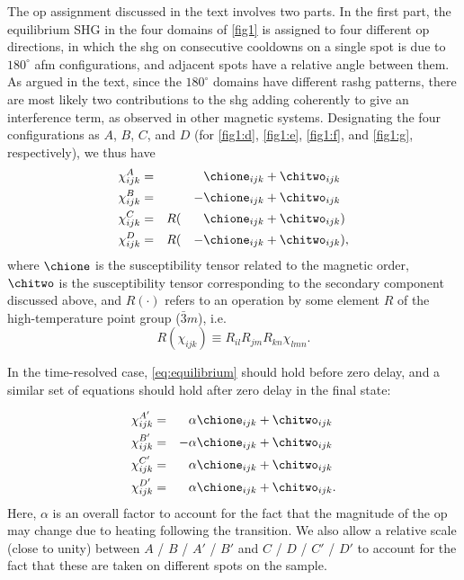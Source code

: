 The \gls{op} assignment discussed in the text involves two parts.
In the first part, the equilibrium SHG in the four domains of \cref{fig1} is assigned to four different \gls{op} directions, in which the \gls{shg} on consecutive cooldowns on a single spot is due to $180^\circ$ \gls{afm} configurations, and adjacent spots have a relative angle between them.
As argued in the text, since the $180^\circ$ domains have different \gls{rashg} patterns, there are most likely two contributions to the \gls{shg} adding coherently to give an interference term, as observed in other magnetic systems\citep{fiebig_second_1994, fiebig_second_2001, fiebig_second-harmonic_2005}.
Designating the four configurations as $A$, $B$, $C$, and $D$ (for \cref{fig1:d}, \cref{fig1:e}, \cref{fig1:f}, and \cref{fig1:g}, respectively), we thus have
\begin{equation}
\begin{aligned}
\label{eq:equilibrium}
\chi^{A}_{ijk} &= &&&&\chione_{ijk}+\chitwo_{ijk}\\
\chi^{B}_{ijk} &= &&&-&\chione_{ijk}+\chitwo_{ijk}\\
\chi^{C}_{ijk} &= &&R(&&\chione_{ijk}+\chitwo_{ijk})\\
\chi^{D}_{ijk} &= &&R(&-&\chione_{ijk}+\chitwo_{ijk}),
\end{aligned}
\end{equation}
where $\chione$ is the susceptibility tensor related to the magnetic order\citep{fiebig_second-harmonic_2005}, $\chitwo$ is the susceptibility tensor corresponding to the secondary component discussed above, and $R(\cdot)$ refers to an operation by some element $R$ of the high-temperature point group ($\bar{3}m$), i.e.
\[
R(\chi_{ijk}) \equiv R_{il}R_{jm}R_{kn}\chi_{lmn}.
\]

In the time-resolved case, \ref{eq:equilibrium} should hold before zero delay, and a similar set of equations should hold after zero delay in the final state:

\begin{equation}
\begin{aligned}
\label{eq:nonequilibrium}
\chi^{A'}_{ijk} &= &&\alpha\chione_{ijk}+\chitwo_{ijk}\\
\chi^{B'}_{ijk} &= &-&\alpha\chione_{ijk}+\chitwo_{ijk}\\
\chi^{C'}_{ijk} &= &&\alpha\chione_{ijk}+\chitwo_{ijk}\\
\chi^{D'}_{ijk} &= &&\alpha\chione_{ijk}+\chitwo_{ijk}.
\end{aligned}
\end{equation}
Here, $\alpha$ is an overall factor to account for the fact that the magnitude of the \gls{op} may change due to heating following the transition.
We also allow a relative scale (close to unity) between $A$ / $B$ / $A'$ / $B'$ and $C$ / $D$ / $C'$ / $D'$ to account for the fact that these are taken on different spots on the sample.

